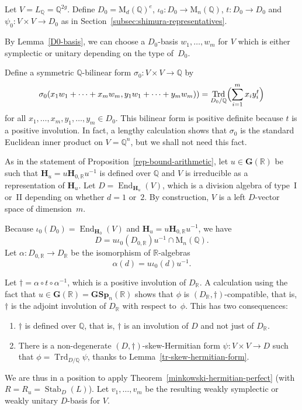 \documentclass[JEP,XML,SOM,Unicode,NoFloatCountersInSection]{cedram}
\newcommand{\bQ}{\mathbb{Q}}
\newcommand{\bR}{\mathbb{R}}
\newcommand{\gG}{\mathbf{G}}
\newcommand{\gGSp}{\mathbf{GSp}}
\newcommand{\gH}{\mathbf{H}}
\newcommand{\rM}{\mathrm{M}}
\DeclareMathOperator{\End}{End}
\DeclareMathOperator{\Stab}{Stab}
\DeclareMathOperator{\Trd}{Trd}
\begin{document}
Let $V = L_\bQ = \bQ^{2g}$.
Define $D_0 = \rM_d(\bQ)^e$, $\iota_0 \colon D_0 \to \rM_n(\bQ)$, $t \colon D_0 \to D_0$ and $\psi_0 \colon V \times V \to D_0$ as in Section~\ref{subsec:shimura-representatives}.

By Lemma~\ref{D0-basis}, we can choose a $D_0$-basis $w_1, \dotsc, w_m$ for $V$ which is either symplectic or unitary depending on the type of~$D_0$.

Define a symmetric $\bQ$-bilinear form $\sigma_0 \colon V \times V \to \bQ$ by
\[
\sigma_0(x_1w_1 + \dotsb + x_mw_m, y_1w_1 + \dotsb + y_mw_m)) = \Trd_{D_0/\bQ} \Bigl(\sum_{i=1}^m x_i y_i^t\Bigr)
\]
for all $x_1, \dotsc, x_m, y_1, \dotsc, y_m \in D_0$.
This bilinear form is positive definite because $t$ is a positive involution.
In fact, a lengthy calculation shows that $\sigma_0$ is the standard Euclidean inner product on $V = \bQ^n$, but we shall not need this fact.

As in the statement of Proposition~\ref{rep-bound-arithmetic}, let $u \in \gG(\bR)$ be such that $\gH_u = u\gH_{0,\bR}u^{-1}$ is defined over $\bQ$ and $V$ is irreducible as a representation of $\gH_u$.
Let $D = \End_{\gH_u}(V)$, which is a division algebra of type~I or~II depending on whether $d=1$ or~$2$.
By construction, $V$ is a left $D$-vector space of dimension~$m$.

Because $\iota_0(D_0) = \End_{\gH_0}(V)$ and $\gH_u = u\gH_{0,\bR}u^{-1}$, we have
\[
D = u\iota_0(D_{0,\bR})u^{-1} \cap \rM_n(\bQ).
\]
Let $\alpha \colon D_{0,\bR} \to D_\bR$ be the isomorphism of $\bR$-algebras
\[
\alpha(d) = u \iota_0(d) u^{-1}.
\]

Let $\dag = \alpha \circ t \circ \alpha^{-1}$, which is a positive involution of $D_\bR$.
A calculation using the fact that $u \in \gG(\bR) = \gGSp_n(\bR)$ shows that $\phi$ is $(D_\bR,\dag)$-compatible, that is, $\dag$ is the adjoint involution of $D_\bR$ with respect to~$\phi$.
This has two consequences:
\begin{enumerate}
\item $\dag$ is defined over $\bQ$, that is, $\dag$ is an involution of $D$ and not just of $D_\bR$.
\item There is a non-degenerate $(D,\dag)$-skew-Hermitian form $\psi \colon V \times V \to D$ such that $\phi = \Trd_{D/\bQ} \psi$, thanks to Lemma~\ref{tr-skew-hermitian-form}.
\end{enumerate}

We are thus in a position to apply Theorem~\ref{minkowski-hermitian-perfect} (with $R=R_u=\Stab_D(L)$).
Let $v_1, \dotsc, v_m$ be the resulting weakly symplectic or weakly unitary $D$-basis for $V$.
\end{document}
